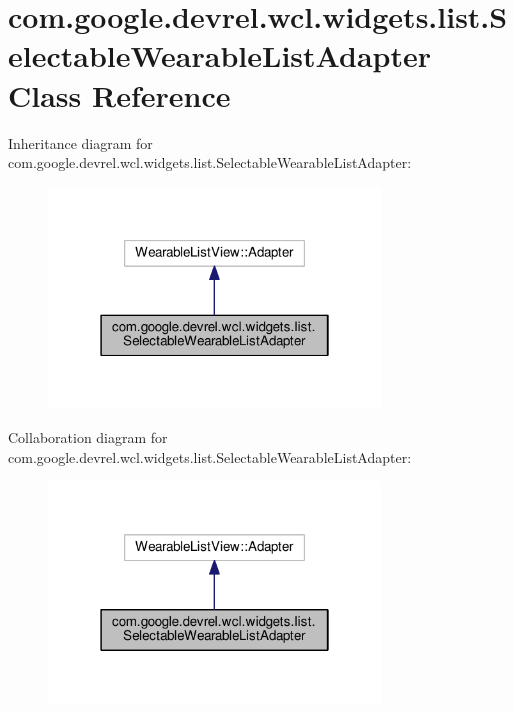 \hypertarget{classcom_1_1google_1_1devrel_1_1wcl_1_1widgets_1_1list_1_1SelectableWearableListAdapter}{}\section{com.\+google.\+devrel.\+wcl.\+widgets.\+list.\+Selectable\+Wearable\+List\+Adapter Class Reference}
\label{classcom_1_1google_1_1devrel_1_1wcl_1_1widgets_1_1list_1_1SelectableWearableListAdapter}


Inheritance diagram for com.\+google.\+devrel.\+wcl.\+widgets.\+list.\+Selectable\+Wearable\+List\+Adapter\+:
\nopagebreak
\begin{figure}[H]
\begin{center}
\leavevmode
\includegraphics[width=250pt]{d5/d65/classcom_1_1google_1_1devrel_1_1wcl_1_1widgets_1_1list_1_1SelectableWearableListAdapter__inherit__graph}
\end{center}
\end{figure}


Collaboration diagram for com.\+google.\+devrel.\+wcl.\+widgets.\+list.\+Selectable\+Wearable\+List\+Adapter\+:
\nopagebreak
\begin{figure}[H]
\begin{center}
\leavevmode
\includegraphics[width=250pt]{d7/d02/classcom_1_1google_1_1devrel_1_1wcl_1_1widgets_1_1list_1_1SelectableWearableListAdapter__coll__graph}
\end{center}
\end{figure}
